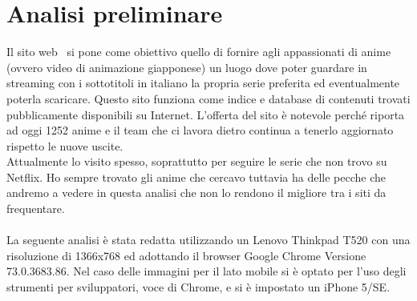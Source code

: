 \section{Analisi preliminare}
Il sito web \nomeSito \ si pone come obiettivo quello di fornire agli appassionati di anime (ovvero video di animazione giapponese) un luogo dove poter guardare in streaming con i sottotitoli in italiano la propria serie preferita ed eventualmente poterla scaricare. Questo sito funziona come indice e database di contenuti trovati pubblicamente disponibili su Internet. L'offerta del sito è notevole perché riporta ad oggi 1252 anime e il team che ci lavora dietro continua a tenerlo aggiornato rispetto le nuove uscite. \\
Attualmente lo visito spesso, soprattutto per seguire le serie che non trovo su Netflix. Ho sempre trovato gli anime che cercavo tuttavia ha delle pecche che andremo a vedere in questa analisi che non lo rendono il migliore tra i siti da frequentare.
\\
\\
La seguente analisi è stata redatta utilizzando un Lenovo Thinkpad T520 con una risoluzione di 1366x768 ed adottando il browser Google Chrome Versione 73.0.3683.86. Nel caso delle immagini per il lato mobile si è optato per l'uso degli strumenti per sviluppatori, voce di Chrome, e si è impostato un iPhone 5/SE.  
